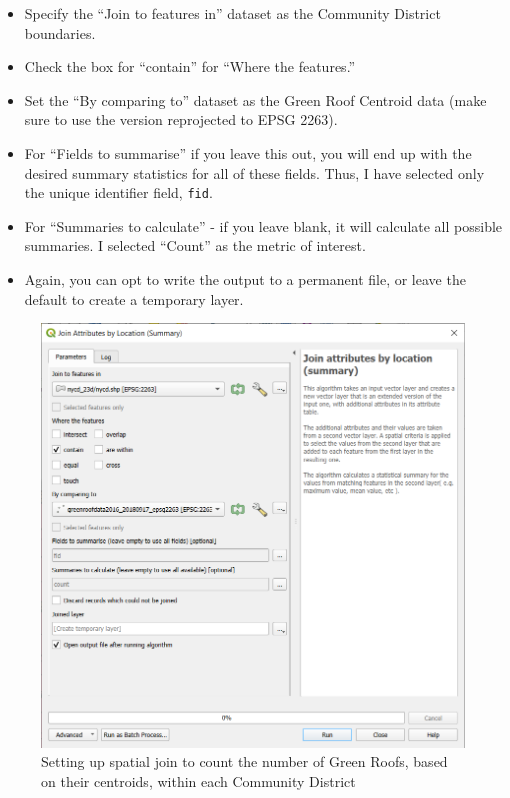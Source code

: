 \documentclass[
  letterpaper,
  DIV=11,
  numbers=noendperiod]{scrreprt}
\providecommand{\tightlist}{%
  \setlength{\itemsep}{0pt}\setlength{\parskip}{0pt}}\usepackage{longtable,booktabs,array}
\begin{document}
\begin{itemize}
\tightlist
\item
  Specify the ``Join to features in'' dataset as the Community District
  boundaries.
\item
  Check the box for ``contain'' for ``Where the features.''
\item
  Set the ``By comparing to'' dataset as the Green Roof Centroid data
  (make sure to use the version reprojected to EPSG 2263).
\item
  For ``Fields to summarise'' if you leave this out, you will end up
  with the desired summary statistics for all of these fields. Thus, I
  have selected only the unique identifier field, \texttt{fid}.
\item
  For ``Summaries to calculate'' - if you leave blank, it will calculate
  all possible summaries. I selected ``Count'' as the metric of
  interest.
\item
  Again, you can opt to write the output to a permanent file, or leave
  the default to create a temporary layer.
\end{itemize}

\begin{figure}

{\centering \includegraphics{./images/count_points_setup.png}

}

\caption{Setting up spatial join to count the number of Green Roofs,
based on their centroids, within each Community District}

\end{figure}
\end{document}
